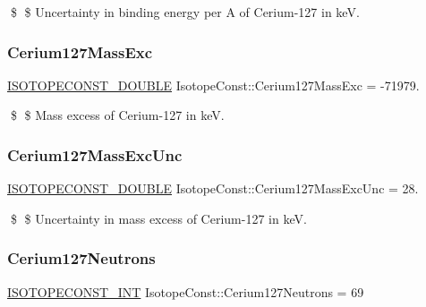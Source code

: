 \$ \$ Uncertainty in binding energy per A of Cerium-\/127 in keV. \mbox{\label{group___isotope_const-_cerium-_ce127_ga485868bbec29c017184f4e6ca5e6b70d}} 
\subsubsection{\texorpdfstring{Cerium127\+Mass\+Exc}{Cerium127MassExc}}
{\footnotesize\ttfamily \mbox{\hyperlink{group___isotope_const-_macros_ga8f45a7272ce02c0b4c65c44636ed719a}{I\+S\+O\+T\+O\+P\+E\+C\+O\+N\+S\+T\+\_\+\+D\+O\+U\+B\+LE}} Isotope\+Const\+::\+Cerium127\+Mass\+Exc = -\/71979.}

\$ \$ Mass excess of Cerium-\/127 in keV. \mbox{\label{group___isotope_const-_cerium-_ce127_ga4f5bae89e619793e450bfed41fc520ce}} 
\subsubsection{\texorpdfstring{Cerium127\+Mass\+Exc\+Unc}{Cerium127MassExcUnc}}
{\footnotesize\ttfamily \mbox{\hyperlink{group___isotope_const-_macros_ga8f45a7272ce02c0b4c65c44636ed719a}{I\+S\+O\+T\+O\+P\+E\+C\+O\+N\+S\+T\+\_\+\+D\+O\+U\+B\+LE}} Isotope\+Const\+::\+Cerium127\+Mass\+Exc\+Unc = 28.}

\$ \$ Uncertainty in mass excess of Cerium-\/127 in keV. \mbox{\label{group___isotope_const-_cerium-_ce127_ga03535246504bc518235868a2796e670a}} 
\subsubsection{\texorpdfstring{Cerium127\+Neutrons}{Cerium127Neutrons}}
{\footnotesize\ttfamily \mbox{\hyperlink{group___isotope_const-_macros_ga5f18360b3e99483a35c32d789e62621c}{I\+S\+O\+T\+O\+P\+E\+C\+O\+N\+S\+T\+\_\+\+I\+NT}} Isotope\+Const\+::\+Cerium127\+Neutrons = 69}

